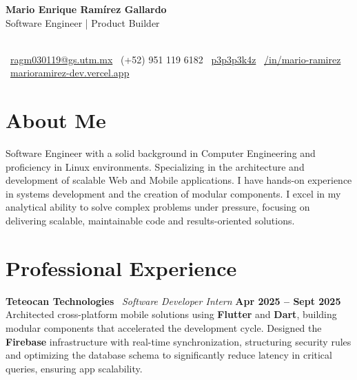 \documentclass[a4paper,11pt]{article}
\newcommand{\entry}[4]{
  \vspace{2pt}
  {\bfseries #1} \textbullet\ \textit{#2} \hfill \textbf{\footnotesize #3} \\
  {\small #4} \par 
  \vspace{4pt}
}
\begin{document}
\pagestyle{empty}

\begin{center}
    {\LARGE \textbf{Mario Enrique Ramírez Gallardo}} \\ \vspace{2pt}
    {\large Software Engineer | Product Builder} \\ \vspace{4pt} \\ \vspace{4pt}
    
    \small
    \faEnvelope\ \href{mailto:ragm030119@gs.utm.mx}{ragm030119@gs.utm.mx} \quad \textbullet \quad
    \faPhone\ (+52) 951 119 6182 \quad \textbullet \quad
    \faGithub\ \href{https://github.com/p3p3p3k4z}{p3p3p3k4z} \quad \textbullet \quad
    \faLinkedin\ \href{https://www.linkedin.com/in/mario-ramirez-abab9a318/}{/in/mario-ramirez} \\
    \faGlobe\ \href{https://marioramirez-dev.vercel.app/}{marioramirez-dev.vercel.app}
\end{center}

\vspace{-6pt}

\section*{About Me}
\small Software Engineer with a solid background in Computer Engineering and proficiency in Linux environments. Specializing in the architecture and development of scalable Web and Mobile applications. I have hands-on experience in systems development and the creation of modular components. I excel in my analytical ability to solve complex problems under pressure, focusing on delivering scalable, maintainable code and results-oriented solutions.

\section*{Professional Experience}

\entry{Teteocan Technologies}{Software Developer Intern}{Apr 2025 -- Sept 2025}
{Architected cross-platform mobile solutions using \textbf{Flutter} and \textbf{Dart}, building modular components that accelerated the development cycle. Designed the \textbf{Firebase} infrastructure with real-time synchronization, structuring security rules and optimizing the database schema to significantly reduce latency in critical queries, ensuring app scalability.}
\end{document}
